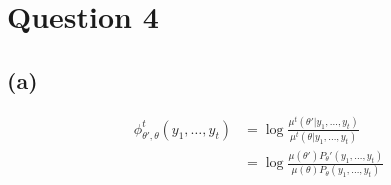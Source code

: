 \documentclass{article}
\begin{document}



\section{Question 4}%
\label{sec:Question 4}

\subsection{(a)} %

\newcommand{\ydots}{y_1, \ldots, y_t}
\renewcommand{\Pth}{P_\theta}
\newcommand{\Pthp}{P_\theta'}
\newcommand{\PHI}{\phi_{\theta', \theta}^t}
\newcommand{\prodtau}{\prod_{\tau  = 1}^{t-1}}
\newcommand{\sumtau}{\sum_{\tau  = 1}^{t-1}}
\begin{equation}
\begin{split}
  \PHI(\ydots) & = \log \frac{\mu^t(\theta' | \ydots)}
                   {\mu^t(\theta | \ydots)} \\
               & = \log \frac{\mu(\theta')\Pthp(\ydots)}
                   {\mu(\theta)\Pth(\ydots)}
\end{split}
\end{equation}
\end{document}
